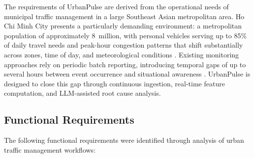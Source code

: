   The requirements of UrbanPulse are derived from the operational needs of                                                                                
  municipal traffic management in a large Southeast Asian metropolitan area.
  Ho Chi Minh City presents a particularly demanding environment: a
  metropolitan population of approximately 8~million, with personal vehicles
  serving up to 85\% of daily travel needs and peak-hour congestion
  patterns that shift substantially across zones, time of day, and
  meteorological conditions \cite{hcmc_transport_report}.                                                                  
  Existing monitoring approaches rely on periodic batch reporting, introducing                                                                            
  temporal gaps of up to several hours between event occurrence and situational                                                                           
  awareness \cite{batch_latency_survey}. UrbanPulse is designed to close this                                                                             
  gap through continuous ingestion, real-time feature computation, and                                                                                    
  LLM-assisted root cause analysis.                                                                                                                       
                                                                                                                                                          
  \subsection{Functional Requirements}
  \label{subsec:functional_req}                                                                                                                           
                                                                                                                                                          
  The following functional requirements were identified through analysis of                                                                               
  urban traffic management workflows:
                                                                                                                                                          
